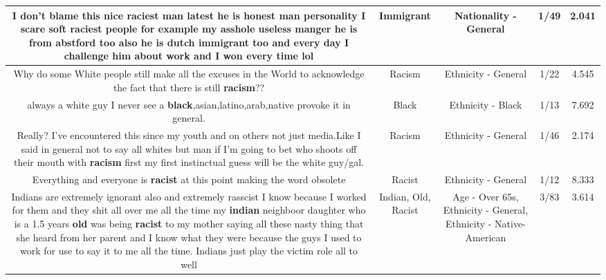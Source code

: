 \documentclass[11pt]{article}
\newlength\mylength
\begin{document}
\begin{center}
\begin{longtable}{|C{.65\mylength}|C{.30\mylength}|C{.12\mylength}|C{.12\mylength}|C{.12\mylength}|}
  \small I don't blame this nice raciest  man latest he is  honest man  personality I scare soft raciest people for example  my  asshole useless manger  he is from abstford too also he is dutch  \textbf{immigrant} too and every day I challenge him  about  work and I won every time  lol\normalsize   & Immigrant & Nationality - General & 1/49 & 2.041 \\  \hline
  \small Why do some White people still make all the excuses in the World to acknowledge the fact that there is still \textbf{racism}??\normalsize   & Racism & Ethnicity - General & 1/22 & 4.545 \\  \hline
  \small always a white guy I never see a \textbf{black},asian,latino,arab,native provoke it in general.\normalsize   & Black & Ethnicity - Black & 1/13 & 7.692 \\  \hline
  \small Really? I've encountered this since my youth and on others not just media.Like I said in general not to say all whites but man if I'm going to bet who shoots off their mouth with \textbf{racism} first my first instinctual guess will be the white guy/gal.\normalsize   & Racism & Ethnicity - General & 1/46 & 2.174 \\  \hline
  \small Everything and everyone is \textbf{racist} at this point making the word obsolete\normalsize   & Racist & Ethnicity - General & 1/12 & 8.333 \\  \hline
  \small Indians are extremely ignorant also and extremely rasscist I know because I worked for them and they shit all over me all the time my \textbf{indian} neighboor daughter who is a 1.5 years \textbf{old} was being \textbf{racist} to my mother saying all these nasty thing that she heard from her parent and I know what they were because the guys I used to work for use to say it to me all the time. Indians just play the victim role all to well\normalsize   & Indian, Old, Racist & Age - Over 65s, Ethnicity - General, Ethnicity - Native-American & 3/83 & 3.614 \\  \hline

\end{longtable}
\end{center}
\end{document}

